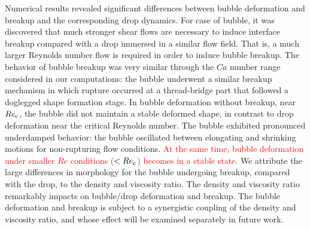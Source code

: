 \documentclass{elsarticle}
\begin{document}
Numerical results revealed significant differences between bubble deformation
and breakup and the corresponding drop dynamics.  For case of bubble, it was
discovered that much stronger shear flows are necessary to induce interface
breakup compared with a drop immersed in a similar flow field.  That is, a much
larger Reynolds number flow is required in order to induce bubble breakup.  The
behavior of bubble breakup was very similar through the $Ca$ number range
considered in our computations: the bubble underwent a similar breakup
mechanism in which rupture occurred at a thread-bridge part that followed a
doglegged shape formation stage.  In bubble deformation without breakup, near
$Re_{\rm c}$, the bubble did not maintain a stable deformed shape, in contrast to
drop deformation near the critical Reynolds number.  The bubble exhibited
pronounced underdamped behavior: the bubble oscillated between elongating and
shrinking motions for non-rupturing flow conditions.
\textcolor{red}
{
At the same time, bubble deformation under smaller $Re$ conditions ($< Re_{\rm c}$)
becomes in a stable state.
}
We attribute the large differences in morphology for the bubble undergoing
breakup, compared with the drop, to the density and viscosity ratio.  The
density and viscosity ratio remarkably impacts on bubble/drop deformation and
breakup.  The bubble deformation and breakup is subject to a synergistic
coupling of the density and viscosity ratio, and whose effect will be examined
separately in future work.


 


\end{document}

